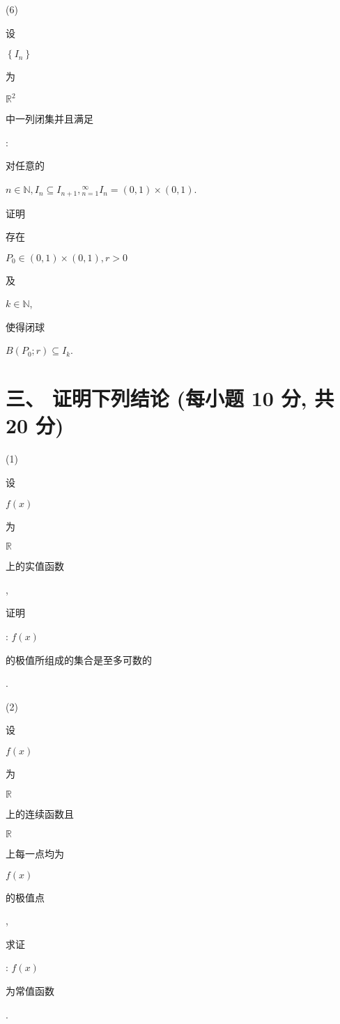 \documentclass[10pt]{article}
\begin{document}
(6) \begin{CJK}{UTF8}{mj}设\end{CJK} $\left\{I_{n}\right\}$ \begin{CJK}{UTF8}{mj}为\end{CJK} $\mathbb{R}^{2}$ \begin{CJK}{UTF8}{mj}中一列闭集并且满足\end{CJK}: \begin{CJK}{UTF8}{mj}对任意的\end{CJK} $n \in \mathbb{N}, I_{n} \subseteq I_{n+1},{ }_{n=1}^{\infty} I_{n}=(0,1) \times(0,1)$. \begin{CJK}{UTF8}{mj}证明\end{CJK} \begin{CJK}{UTF8}{mj}存在\end{CJK} $P_{0} \in(0,1) \times(0,1), r>0$ \begin{CJK}{UTF8}{mj}及\end{CJK} $k \in \mathbb{N}$, \begin{CJK}{UTF8}{mj}使得闭球\end{CJK} $B\left(P_{0} ; r\right) \subseteq I_{k}$.

\section{三、 证明下列结论 (每小题 10 分, 共 20 分)}
(1) \begin{CJK}{UTF8}{mj}设\end{CJK} $f(x)$ \begin{CJK}{UTF8}{mj}为\end{CJK} $\mathbb{R}$ \begin{CJK}{UTF8}{mj}上的实值函数\end{CJK}, \begin{CJK}{UTF8}{mj}证明\end{CJK}: $f(x)$ \begin{CJK}{UTF8}{mj}的极值所组成的集合是至多可数的\end{CJK}.

(2) \begin{CJK}{UTF8}{mj}设\end{CJK} $f(x)$ \begin{CJK}{UTF8}{mj}为\end{CJK} $\mathbb{R}$ \begin{CJK}{UTF8}{mj}上的连续函数且\end{CJK} $\mathbb{R}$ \begin{CJK}{UTF8}{mj}上每一点均为\end{CJK} $f(x)$ \begin{CJK}{UTF8}{mj}的极值点\end{CJK}, \begin{CJK}{UTF8}{mj}求证\end{CJK}: $f(x)$ \begin{CJK}{UTF8}{mj}为常值函数\end{CJK}.
\end{document}
